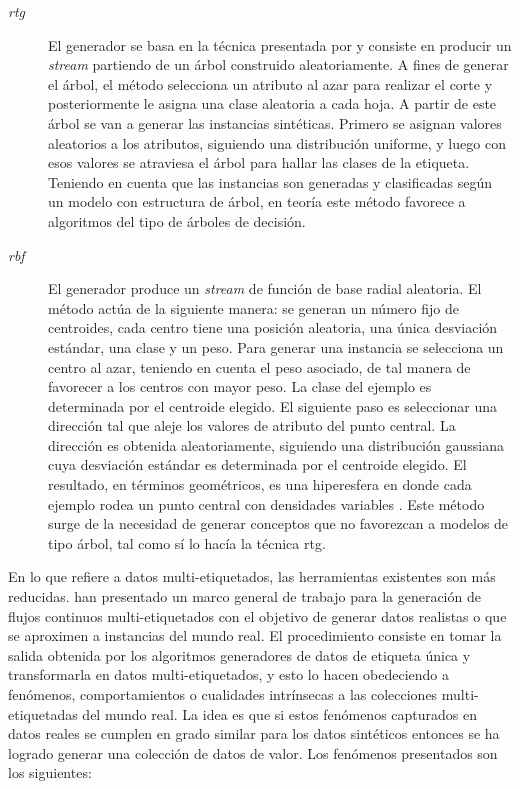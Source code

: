 \begin{description}

   \item[\textit{\acrfull{rtg}}] El generador se basa en la técnica presentada
      por \citeauthor{domingos_mining_2002} \cite{domingos_mining_2002} y
      consiste en producir un \textit{stream} partiendo de un árbol construido
      aleatoriamente. A fines de generar el árbol, el método selecciona un
      atributo al azar para realizar el corte y posteriormente le asigna una
      clase aleatoria a cada hoja. A partir de este árbol se van a generar las
      instancias sintéticas.  Primero se asignan valores aleatorios a los
      atributos, siguiendo una distribución uniforme, y luego con esos valores
      se atraviesa el árbol para hallar las clases de la etiqueta. Teniendo en
      cuenta que las instancias son generadas y clasificadas según un modelo con
      estructura de árbol, en teoría este método favorece a algoritmos del tipo
      de árboles de decisión.

   \item[\textit{\acrfull{rbf}}] El generador produce un \textit{stream} de
      función de base radial aleatoria. El método actúa de la siguiente manera:
      se generan un número fijo de centroides, cada centro tiene una posición
      aleatoria, una única desviación estándar, una clase y un peso. Para
      generar una instancia se selecciona un centro al azar, teniendo en cuenta
      el peso asociado, de tal manera de favorecer a los centros con mayor peso.
      La clase del ejemplo es determinada por el centroide elegido. El siguiente
      paso es seleccionar una dirección tal que aleje los valores de atributo
      del punto central. La dirección es obtenida aleatoriamente, siguiendo una
      distribución gaussiana cuya desviación estándar es determinada por el
      centroide elegido.  El resultado, en términos geométricos, es una
      hiperesfera en donde cada ejemplo rodea un punto central con densidades
      variables \cite{kirkby_improving_2007}. Este método surge de la
      necesidad de generar conceptos que no favorezcan a modelos de tipo árbol,
      tal como sí lo hacía la técnica \acrshort{rtg}.

\end{description}

En lo que refiere a datos multi-etiquetados, las herramientas existentes son más
reducidas. \citeauthor{read_generating_2009} han presentado un marco general
de trabajo para la generación de flujos continuos multi-etiquetados
\cite{read_generating_2009} con el objetivo de generar datos realistas o que
se aproximen a instancias del mundo real. El procedimiento consiste en tomar la
salida obtenida por los algoritmos generadores de datos de etiqueta única y
transformarla en datos multi-etiquetados, y esto lo hacen obedeciendo a
fenómenos, comportamientos o cualidades intrínsecas a las colecciones
multi-etiquetadas del mundo real. La idea es que si estos fenómenos capturados
en datos reales se cumplen en grado similar para los datos sintéticos entonces
se ha logrado generar una colección de datos de valor. Los fenómenos presentados
son los siguientes:


